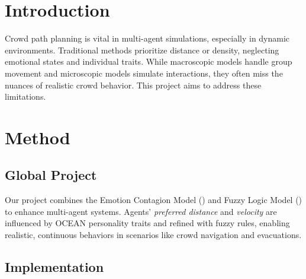 \documentclass[12pt]{article}
\begin{document}
\begin{spacing}{1.15} %
\begin{multicols}{2}


\section{Introduction}
Crowd path planning is vital in multi-agent simulations, especially in dynamic environments. Traditional methods prioritize distance or density, neglecting emotional states and individual traits. While macroscopic models handle group movement and microscopic models simulate interactions, they often miss the nuances of realistic crowd behavior. This project aims to address these limitations.
\section{Method}
\subsection{Global Project}
Our project combines the Emotion Contagion Model (\cite{emotionContagion}) and Fuzzy Logic Model (\cite{fuzzylogic}) to enhance multi-agent systems. Agents' \textit{preferred distance} and \textit{velocity} are influenced by OCEAN personality traits and refined with fuzzy rules, enabling realistic, continuous behaviors in scenarios like crowd navigation and evacuations.

\subsection{Implementation}

\end{multicols}
\end{spacing}
\end{document}
